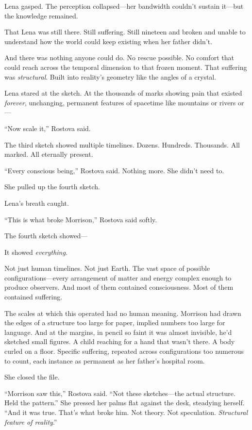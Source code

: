 Lena gasped. The perception collapsed—her bandwidth couldn't sustain it—but the knowledge remained.

That Lena was still there. Still suffering. Still nineteen and broken and unable to understand how the world could keep existing when her father didn't.

And there was nothing anyone could do. No rescue possible. No comfort that could reach across the temporal dimension to that frozen moment. That suffering was \textit{structural}. Built into reality's geometry like the angles of a crystal.

Lena stared at the sketch. At the thousands of marks showing pain that existed \textit{forever}, unchanging, permanent features of spacetime like mountains or rivers or—

``Now scale it,'' Rostova said.

The third sketch showed multiple timelines. Dozens. Hundreds. Thousands. All marked. All eternally present.

``Every conscious being,'' Rostova said. Nothing more. She didn't need to.

She pulled up the fourth sketch.

Lena's breath caught.

``This is what broke Morrison,'' Rostova said softly.

The fourth sketch showed—

It showed \textit{everything}.

Not just human timelines. Not just Earth. The vast space of possible configurations—every arrangement of matter and energy complex enough to produce observers. And most of them contained consciousness. Most of them contained suffering.

The scales at which this operated had no human meaning. Morrison had drawn the edges of a structure too large for paper, implied numbers too large for language. And at the margins, in pencil so faint it was almost invisible, he'd sketched small figures. A child reaching for a hand that wasn't there. A body curled on a floor. Specific suffering, repeated across configurations too numerous to count, each instance as permanent as her father's hospital room.

She closed the file.

``Morrison saw this,'' Rostova said. ``Not these sketches—the actual structure. Held the pattern.'' She pressed her palms flat against the desk, steadying herself. ``And it was true. That's what broke him. Not theory. Not speculation. \textit{Structural feature of reality}.''

